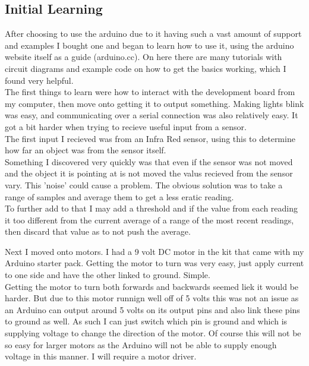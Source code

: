 \documentclass[11pt,fleqn,twoside]{article}
\begin{document}
\subsection{Initial Learning}
After choosing to use the arduino due to it having such a vast amount of support and examples I bought one and began to learn how to use it, using the arduino website itself as a guide (arduino.cc).  On here there are many tutorials with circuit diagrams and example code on how to get the basics working, which I found very helpful.
\\The first things to learn were how to interact with the development board from my computer, then move onto getting it to output something.  Making lights blink was easy, and communicating over a serial connection was also relatively easy.  It got a bit harder when trying to recieve useful input from a sensor.
\\The first input I recieved was from an Infra Red sensor, using this to determine how far an object was from the sensor itself.
\\Something I discovered very quickly was that even if the sensor was not moved and the object it is pointing at is not moved the valus recieved from the sensor vary.  This 'noise' could cause a problem.  The obvious solution was to take a range of samples and average them to get a less eratic reading.
\\To further add to that I may add a threshold and if the value from each reading it too different from the current average of a range of the most recent readings, then discard that value as to not push the average.

Next I moved onto motors.  I had a 9 volt DC motor in the kit that came with my Arduino starter pack.  Getting the motor to turn was very easy, just apply current to one side and have the other linked to ground.  Simple.
\\Getting the motor to turn both forwards and backwards seemed liek it would be harder.  But due to this motor runnign well off of 5 volts this was not an issue as an Arduino can output around 5 volts on its output pins and also link these pins to ground as well.  As such I can just switch which pin is ground and which is supplying voltage to change the direction of the motor.  Of course this will not be so easy for larger motors as the Arduino will not be able to supply enough voltage in this manner.  I will require a motor driver.
\end{document}
